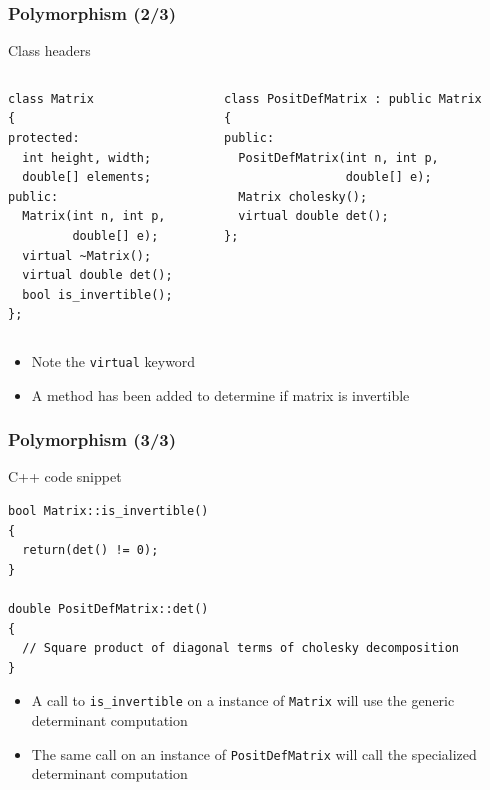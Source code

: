 \documentclass{beamer}
\begin{document}
\begin{frame}[fragile]
  \frametitle{Polymorphism (2/3)}

  \begin{block}{Class headers}
    \begin{scriptsize}
      \begin{columns}[t]
        \begin{column}{4.8cm}
\begin{verbatim}
class Matrix
{
protected:
  int height, width;
  double[] elements;
public:
  Matrix(int n, int p,
         double[] e);
  virtual ~Matrix();
  virtual double det();
  bool is_invertible();
};
\end{verbatim}
        \end{column}
        \begin{column}{6cm}
\begin{verbatim}
class PositDefMatrix : public Matrix
{
public:
  PositDefMatrix(int n, int p,
                 double[] e);
  Matrix cholesky();
  virtual double det();
};
\end{verbatim}
        \end{column}
      \end{columns}
    \end{scriptsize}
    
  \end{block}
  \begin{itemize}
  \item Note the \texttt{virtual} keyword
  \item A method has been added to determine if matrix is invertible
  \end{itemize}
\end{frame}

\begin{frame}[fragile]
  \frametitle{Polymorphism (3/3)}
  \begin{block}{C++ code snippet}
    \begin{scriptsize}
\begin{verbatim}
bool Matrix::is_invertible()
{
  return(det() != 0);
}

double PositDefMatrix::det()
{
  // Square product of diagonal terms of cholesky decomposition
}
\end{verbatim}
    \end{scriptsize}
  \end{block}
  \begin{itemize}
  \item A call to \texttt{is\_invertible} on a instance of \texttt{Matrix} will use the generic determinant computation
  \item The same call on an instance of \texttt{PositDefMatrix} will call the specialized determinant computation
  \end{itemize}
\end{frame}
\end{document}
